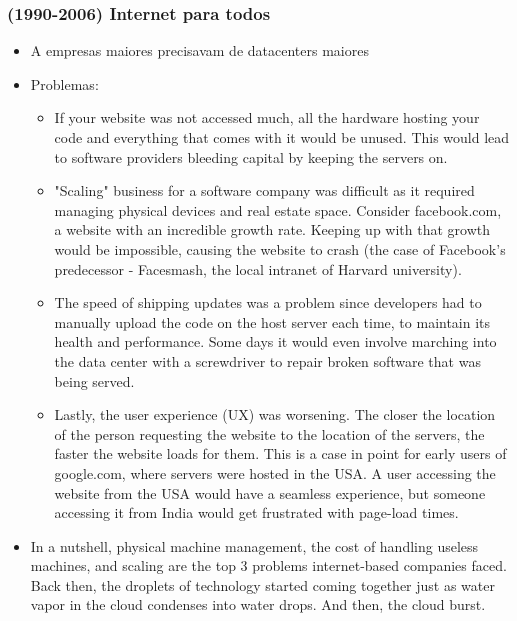 \begin{frame}
	\frametitle{(1990-2006) Internet para todos}
	\begin{itemize}
		\item A empresas maiores precisavam de datacenters maiores
		\item Problemas:
			\begin{itemize}
				\item If your website was not accessed much, all the hardware hosting your code and everything that comes with it would be unused. This would lead to software providers  bleeding capital by keeping the servers on.
				\item "Scaling" business for a software company was difficult as it required managing physical devices and real estate space. Consider facebook.com, a website with an incredible growth rate. Keeping up with that growth would be impossible, causing the website to crash (the case of Facebook's predecessor - Facesmash, the local intranet of Harvard university).
				\item The speed of shipping updates was a problem since developers had to manually upload the code on the host server each time, to maintain its health and performance. Some days it would even involve marching into the data center with a screwdriver to repair broken software that was being served.
				\item Lastly, the user experience (UX) was worsening. The closer the location of the person requesting the website to the location of the servers, the faster the website loads for them. This is a case in point for early users of google.com, where servers were hosted in the USA. A user accessing the website from the USA would have a seamless experience, but someone accessing it from India would get frustrated with page-load times.
			\end{itemize}
		\item In a nutshell, physical machine management, the cost of handling useless machines, and scaling are the top 3 problems internet-based companies faced. Back then, the droplets of technology started coming together just as water vapor in the cloud condenses into water drops. And then, the cloud burst.
	\end{itemize}
\end{frame}

